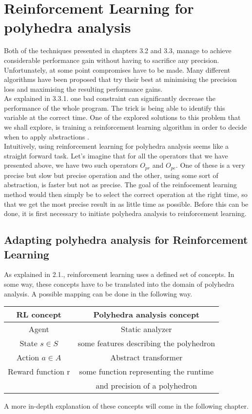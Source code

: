 \section{Reinforcement Learning for polyhedra analysis}
Both of the techniques presented in chapters 3.2 and 3.3, manage to achieve considerable performance gain without having to sacrifice any precision. Unfortunately, at some point compromises have to be made. Many different algorithms have been proposed that try their best at minimising the precision loss and maximising the resulting performance gains. \\
As explained in 3.3.1. one bad constraint can significantly decrease the performance of the whole program. The trick is being able to identify this variable at the correct time. One of the explored solutions to this problem that we shall explore, is training a reinforcement learning algorithm  in order to decide when to apply abstractions \cite{singh2018fast}.\\
Intuitively, using reinforcement learning for polyhedra analysis seems like a straight forward task. Let's imagine that for all the operators that we have presented above, we have two such operators $O_{pr}$ and $O_{pe}$. One of these is a very precise but slow but precise operation and the other, using some sort of abstraction, is faster but not as precise. The goal of the reinfocement learning method would then simply be to select the correct operation at the right time, so that we get the most precise result in as little time as possible. Before this can be done, it is first necessary to initiate polyhedra analysis to reinforcement learning.

\subsection{Adapting polyhedra analysis for Reinforcement Learning}
As explained in 2.1., reinforcement learning uses a defined set of concepts. In some way, these concepts have to be translated into the domain of polyhedra analysis. A possible mapping can be done in the following way.
\begin{center}
\begin{tabular}{||c c||} 
 
 \hline
 RL concept & Polyhedra analysis concept  \\ [0.5ex] 
 \hline
 Agent & Static analyzer\\ 
 \hline
 State $s\in S$ & some features describing the polyhedron\\
 \hline
 Action $a \in A$ & Abstract transformer \\
 \hline
 Reward function r & some function representing the runtime\\
 
  & and precision of a polyhedron\\
 \hline
\end{tabular}
\end{center}
A more in-depth explanation of these concepts will come in the following chapter.

